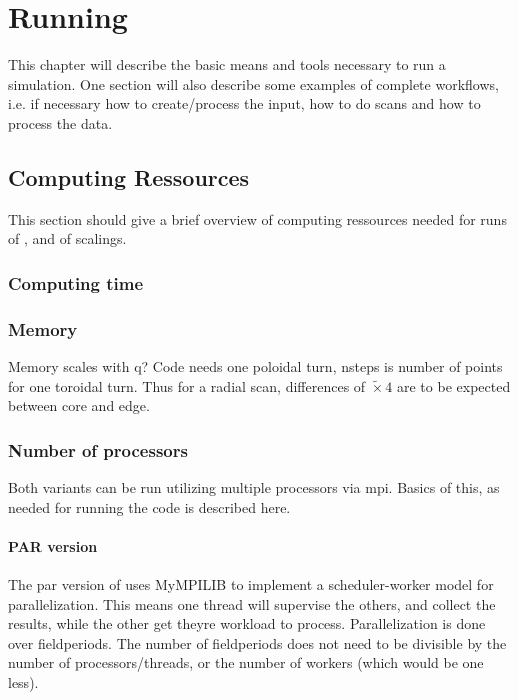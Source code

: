 \chapter{Running}
This chapter will describe the basic means and tools necessary to run a
\neotwo simulation.
One section will also describe some examples of complete workflows, i.e.
if necessary how to create/process the input, how to do scans and how to
process the data.

\section{Computing Ressources}
This section should give a brief overview of computing ressources needed
for runs of \neotwo, and of scalings.

\subsection{Computing time}

\subsection{Memory}
Memory scales with q? Code needs one poloidal turn, nsteps
is number of points for one toroidal turn. Thus for a radial scan,
differences of $\tilde \times 4$ are to be expected between core and
edge.

\subsection{Number of processors}
Both variants can be run utilizing multiple processors via mpi. Basics
of this, as needed for running the code is described here.

\subsubsection{PAR version}
The par version of \neotwo uses MyMPILIB to implement a scheduler-worker
model for parallelization. This means one thread will supervise the
others, and collect the results, while the other get theyre workload to
process.
Parallelization is done over fieldperiods. The number of fieldperiods
does not need to be divisible by the number of processors/threads, or
the number of workers (which would be one less).

